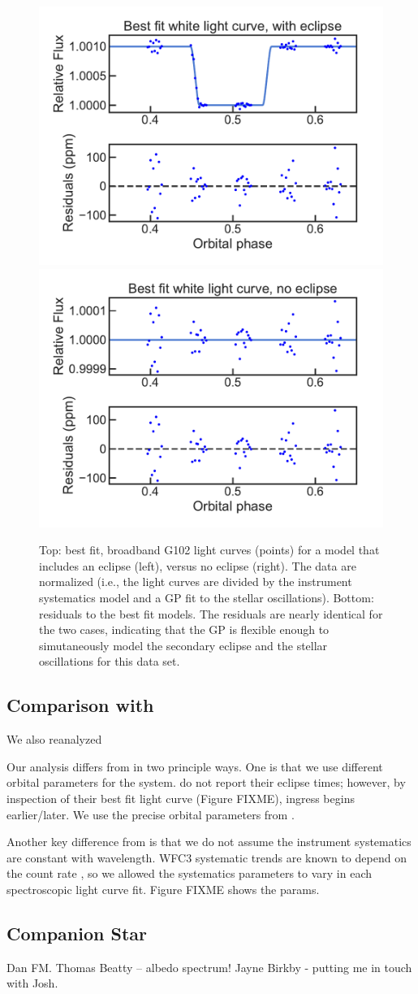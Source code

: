 \documentclass[twocolumn]{aastex62}
\begin{document}
\begin{figure}
\includegraphics[width = 0.5 \textwidth]{figures/eclipse.pdf}
\includegraphics[width = 0.5 \textwidth]{figures/no_eclipse.pdf}
\caption{Top: best fit, broadband G102 light curves (points) for a model that includes an eclipse (left), versus no eclipse (right). The data are normalized (i.e., the light curves are divided by the instrument systematics model and a GP fit to the stellar oscillations). Bottom: residuals to the best fit models. The residuals are nearly identical for the two cases, indicating that the GP is flexible enough to simutaneously model the secondary eclipse and the stellar oscillations for this data set.} 
\label{fig:GP}
\end{figure}

\subsection{Comparison with \cite{haynes15}}
We also reanalyzed 

Our analysis differs from \cite{haynes15} in two principle ways. One is that we use different orbital parameters for the system. \cite{haynes15} do not report their eclipse times; however, by inspection of their best fit light curve (Figure FIXME), ingress begins earlier/later. We use the precise orbital parameters from \cite{zhang17}.

Another key difference from \cite{haynes15} is that we do not assume the instrument systematics are constant with wavelength. WFC3 systematic trends are known to depend on the count rate \cite{zhou17}, so we allowed the systematics parameters to vary in each spectroscopic light curve fit.  Figure FIXME shows the params.


\subsection{Companion Star}

\acknowledgments
Dan FM. Thomas Beatty -- albedo spectrum! Jayne Birkby - putting me in touch with Josh.



\end{document}
